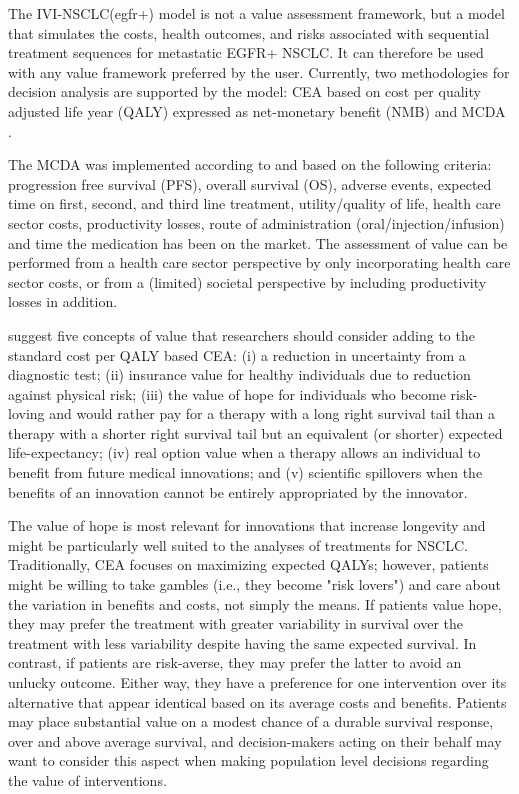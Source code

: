 \documentclass[11pt,final,fleqn]{article}\usepackage[]{graphicx}\usepackage[]{color}
\theoremstyle{plain}
\begin{document}
{The IVI-NSCLC(egfr+) model is not a value assessment framework, but a model that simulates the costs, health outcomes, and risks associated with sequential treatment sequences for metastatic EGFR+ NSCLC. It can therefore be used with any value framework preferred by the user. Currently, two methodologies for decision analysis are supported by the model: CEA based on cost per quality adjusted life year (QALY) expressed as net-monetary benefit (NMB) and MCDA \citep{keeney1993decisions}. 

The MCDA was implemented according to \citet{thokala2016multiple} and based on the following criteria: progression free survival (PFS), overall survival (OS), adverse events, expected time on first, second, and third line treatment, utility/quality of life, health care sector costs, productivity losses, route of administration (oral/injection/infusion) and time the medication has been on the market. The assessment of value can be performed from a health care sector perspective by only incorporating health care sector costs, or from a (limited) societal perspective by including productivity losses in addition.

\citet{garrison2017toward} suggest five concepts of value that researchers should consider adding to the standard cost per QALY based CEA: (i) a reduction in uncertainty from a diagnostic test; (ii) insurance value for healthy individuals due to reduction against physical risk; (iii) the value of hope for individuals who become risk-loving and would rather pay for a therapy with a long right survival tail than a therapy with a shorter right survival tail but an equivalent (or shorter) expected life-expectancy; (iv) real option value when a therapy allows an individual to benefit from future medical innovations; and (v) scientific spillovers when the benefits of an innovation cannot be entirely appropriated by the innovator.

The value of hope is most relevant for innovations that increase longevity and might be particularly well suited to the analyses of treatments for NSCLC. Traditionally, CEA focuses on maximizing expected QALYs; however, patients might be willing to take gambles (i.e., they become "risk lovers") and care about the variation in benefits and costs, not simply the means. If patients value hope, they may prefer the treatment with greater variability in survival over the treatment with less variability despite having the same expected survival. In contrast, if patients are risk-averse, they may prefer the latter to avoid an unlucky outcome. Either way, they have a preference for one intervention over its alternative that appear identical based on its average costs and benefits. Patients may place substantial value on a modest chance of a durable survival response, over and above average survival, and decision-makers acting on their behalf may want to consider this aspect when making population level decisions regarding the value of interventions. 

}
\end{document}
